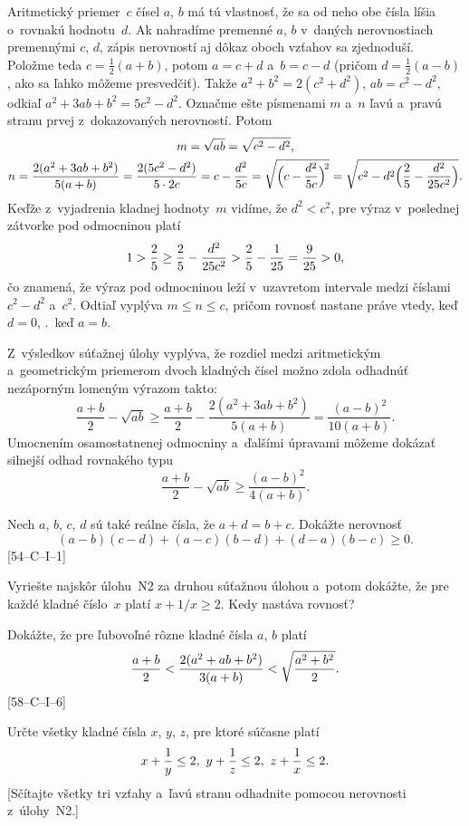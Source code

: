 {\ineriesenie
Aritmetický priemer~$c$ čísel $a$, $b$ má tú vlastnosť, že sa od neho obe čísla líšia
o~rovnakú hodnotu~$d$. Ak nahradíme premenné $a$, $b$ v~daných nerovnostiach premennými
$c$, $d$, zápis nerovností aj dôkaz oboch vzťahov sa zjednoduší.
Položme teda $c=\frac12(a+b)$, potom $a=c+d$ a~$b=c-d$ (pričom $d=\frac12(a-b)$,
ako sa ľahko môžeme presvedčiť).  Takže
$a^2+b^2=2(c^2+d^2)$, $ab=c^2-d^2$, odkiaľ $a^2+3ab+b^2=5c^2-d^2$.
Označme ešte písmenami $m$ a~$n$ ľavú a~pravú stranu prvej z~dokazovaných
nerovností. Potom
$$
\gathered
m=\sqrt{ab}= \sqrt{c^2-d^2},\\
n={2(a^2+3ab+b^2)\over 5(a+b)}=\frac{2(5c^2-d^2)}{5\cdot 2c}=c-{d^2\over5c}
=\sqrt{\Bigl(c-{d^2\over5c}\Bigr)^{\!2}}
 =\sqrt{c^2-d^2\Bigl({2\over5}-{d^2\over25c^2}\Bigr)}.
\endgathered
$$
Keďže z~vyjadrenia kladnej hodnoty~$m$ vidíme, že $d^2<c^2$, pre výraz
v~poslednej zátvorke pod odmocninou platí
$$
1>\frac25\ge{2\over5}-{d^2\over25c^2}>\frac25-\frac{1}{25}=\frac{9}{25}>0,
$$
čo znamená, že výraz pod odmocninou leží v~uzavretom intervale medzi číslami $c^2-d^2$ a~$c^2$.
Odtiaľ vyplýva $m\le n\le c$, pričom rovnosť nastane práve vtedy, keď $d = 0$, \tj.~keď $a=b$.

\poznamka
Z~výsledkov súťažnej úlohy vyplýva, že rozdiel medzi aritmetickým
a~geometrickým priemerom dvoch kladných čísel možno zdola odhadnúť nezáporným
lomeným výrazom takto:
$$
\frac{a+b}{2}-\sqrt{ab}\ge
\frac{a+b}{2}-\frac{2(a^2+3ab+b^2)}{5(a+b)}=
\frac{(a-b)^2}{10(a+b)}.
$$
Umocnením osamostatnenej odmocniny a~ďalšími úpravami môžeme dokázať
silnejší odhad rovnakého typu
$$
\frac{a+b}{2}-\sqrt{ab}\ge \frac{(a-b)^2}{4(a+b)}.
$$


Nech $a$, $b$, $c$, $d$ sú také reálne čísla, že $a + d = b + c$. Dokážte nerovnosť
$$
(a-b)(c-d)+(a-c)(b-d)+(d-a)(b-c)\ge0.
$$
[54--C--I--1]

Vyriešte najskôr úlohu~N2 za druhou súťažnou úlohou a~potom dokážte, že pre každé kladné číslo~$x$ platí $x+1/x\ge 2$.
Kedy nastáva rovnosť?

\D
Dokážte, že pre ľubovoľné rôzne kladné čísla $a$, $b$ platí
$$
{a+b\over2}<{2(a^2+ab+b^2)\over3(a+b)}<\sqrt{a^2+b^2\over2}.
$$
[58--C--I--6]

Určte všetky kladné čísla $x$, $y$, $z$, pre ktoré súčasne platí
$$
x+{1\over y}\le 2,\ y+{1\over z}\le 2,\ z+{1\over x}\le 2.
$$
[Sčítajte všetky tri vzťahy a~ľavú stranu odhadnite pomocou nerovnosti z~úlohy~N2.]
}

